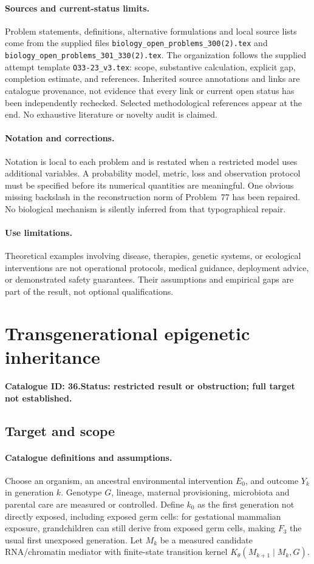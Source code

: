 \documentclass[11pt]{article}
\begin{document}
\paragraph{Sources and current-status limits.}
Problem statements, definitions, alternative formulations and local source lists
come from the supplied files
\texttt{biology\_open\_problems\_300(2).tex} and
\texttt{biology\_open\_problems\_301\_330(2).tex}.
The organization follows the supplied attempt template
\texttt{O33-23\_v3.tex}: scope, substantive calculation, explicit gap,
completion estimate, and references. Inherited source annotations and links are
catalogue provenance, not evidence that every link or current open status has
been independently rechecked. Selected methodological references appear at the
end. No exhaustive literature or novelty audit is claimed.

\paragraph{Notation and corrections.}
Notation is local to each problem and is restated when a restricted model uses
additional variables. A probability model, metric, loss and observation protocol
must be specified before its numerical quantities are meaningful. One obvious
missing backslash in the reconstruction norm of Problem~77 has been repaired.
No biological mechanism is silently inferred from that typographical repair.

\paragraph{Use limitations.}
Theoretical examples involving disease, therapies, genetic systems, or ecological
interventions are not operational protocols, medical guidance, deployment advice,
or demonstrated safety guarantees. Their assumptions and empirical gaps are part
of the result, not optional qualifications.

\setcounter{section}{35}
\section{Transgenerational epigenetic inheritance}
\label{prob:036}
\noindent\textbf{Catalogue ID: 36.}\quad \textbf{Status: restricted result or obstruction; full target not established.}
\subsection{Target and scope}
\paragraph{Catalogue definitions and assumptions.}
Choose an organism, an ancestral environmental intervention $E_0$, and outcome $Y_k$ in generation $k$. Genotype $G$, lineage, maternal provisioning, microbiota and parental care are measured or controlled. Define $k_0$ as the first generation not directly exposed, including exposed germ cells: for gestational mammalian exposure, grandchildren can still derive from exposed germ cells, making $F_3$ the usual first unexposed generation. Let $M_k$ be a measured candidate RNA/chromatin mediator with finite-state transition kernel $K_\theta(M_{k+1}\mid M_k,G)$.
\end{document}
